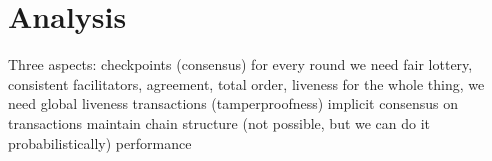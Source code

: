 \chapter{Analysis}
\label{ch:analysis}

Three aspects:
checkpoints (consensus)
    for every round we need fair lottery, consistent facilitators, agreement, total order, liveness
    for the whole thing, we need global liveness
transactions (tamperproofness)
    implicit consensus on transactions
    maintain chain structure (not possible, but we can do it probabilistically)
performance
    

